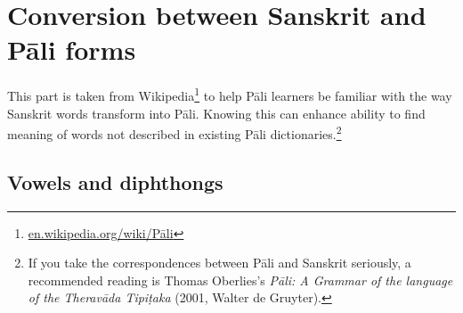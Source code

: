 \chapter{Conversion between Sanskrit and Pāli forms}\label{chap:convsktpali}

This part is taken from Wikipedia\footnote{\url{en.wikipedia.org/wiki/Pāli}} to help Pāli learners be familiar with the way Sanskrit words transform into Pāli. Knowing this can enhance ability to find meaning of words not described in existing Pāli dictionaries.\footnote{If you take the correspondences between Pāli and Sanskrit seriously, a recommended reading is Thomas Oberlies's \emph{Pāli: A Grammar of the language of the Theravāda Tipiṭaka} (2001, Walter de Gruyter).}

\section{Vowels and diphthongs}

